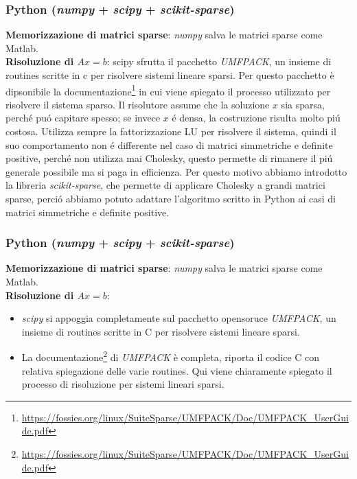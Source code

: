 \documentclass{beamer}
\begin{document}
\begin{frame}
\frametitle{Python (\textit{numpy} + \textit{scipy} + \textit{scikit-sparse})}
\textbf{Memorizzazione di matrici sparse}: \textit{numpy} salva le matrici sparse come Matlab.\\
\textbf{Risoluzione di $Ax = b$}: scipy sfrutta il pacchetto \textit{UMFPACK}, un insieme di routines scritte in c per risolvere sistemi lineare sparsi. Per questo pacchetto è dipsonibile la documentazione\footnote{\url{https://fossies.org/linux/SuiteSparse/UMFPACK/Doc/UMFPACK_UserGuide.pdf}}
in cui viene spiegato il processo utilizzato per risolvere il sistema sparso. Il risolutore assume che la soluzione $x$ sia sparsa, perch\'e pu\'o capitare spesso; se invece $x$ \'e densa, la costruzione risulta molto pi\'u costosa. Utilizza sempre la fattorizzazione LU per risolvere il sistema, quindi il suo comportamento non \'e differente nel caso di matrici simmetriche e definite positive, perch\'e non utilizza mai Cholesky, questo permette di rimanere il pi\'u generale possibile ma si paga in efficienza.
Per questo motivo abbiamo introdotto la libreria \textit{scikit-sparse}, che permette di applicare Cholesky a grandi matrici sparse, perci\'o abbiamo potuto adattare l'algoritmo scritto in Python ai casi di matrici simmetriche e definite positive.
\end{frame}

\begin{frame}
	\frametitle{Python (\textit{numpy} + \textit{scipy} + \textit{scikit-sparse})}
	\textbf{Memorizzazione di matrici sparse}: \textit{numpy} salva le matrici sparse come Matlab.\\
	\textbf{Risoluzione di $Ax = b$}:
	\begin{itemize}
		\item \textit{scipy} si appoggia completamente sul pacchetto opensoruce \textit{UMFPACK}, un insieme di routines scritte in C per risolvere sistemi lineare sparsi.

		\item La documentazione\footnote{\url{https://fossies.org/linux/SuiteSparse/UMFPACK/Doc/UMFPACK_UserGuide.pdf}} di \textit{UMFPACK} è completa, riporta il codice C con relativa spiegazione delle varie routines. Qui viene chiaramente spiegato il processo di risoluzione per sistemi lineari sparsi.

	\end{itemize}
\end{frame}
\end{document}
